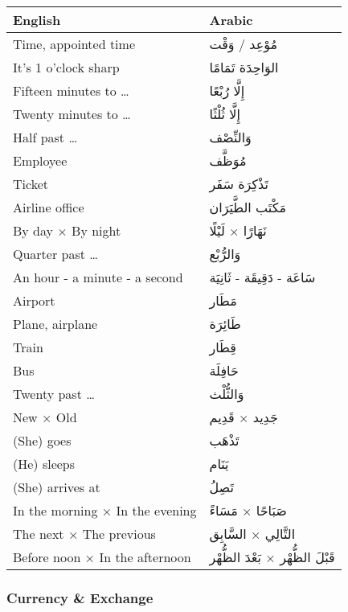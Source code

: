 \documentclass[
  a4paper,
  DIV=11,
  numbers=noendperiod]{scrartcl}
\begin{document}
\begin{longtable}[]{@{}ll@{}}
\toprule\noalign{}
English & Arabic \\
\midrule\noalign{}
\endhead
\bottomrule\noalign{}
\endlastfoot
Time, appointed time & مُوْعِد / وَقْت \\
It's 1 o'clock sharp & الوَاحِدَة تَمَامًا \\
Fifteen minutes to \ldots{} & إِلَّا رُبْعًا \\
Twenty minutes to \ldots{} & إِلَّا ثُلْثًا \\
Half past \ldots{} & وَالنِّصْف \\
Employee & مُوَظَّف \\
Ticket & تَذْكِرَة سَفَر \\
Airline office & مَكْتَب الطَّيَرَان \\
By day × By night & نَهَارًا × لَيْلًا \\
Quarter past \ldots{} & وَالرُّبْع \\
An hour - a minute - a second & سَاعَة - دَقِيقَة - ثَانِيَة \\
Airport & مَطَار \\
Plane, airplane & طَائِرَة \\
Train & قِطَار \\
Bus & حَافِلَة \\
Twenty past \ldots{} & وَالثُّلْث \\
New × Old & جَدِيد × قَدِيم \\
(She) goes & تَذْهَب \\
(He) sleeps & يَنَام \\
(She) arrives at & تَصِلُ \\
In the morning × In the evening & صَبَاحًا × مَسَاءً \\
The next × The previous & التَّالِي × السَّابِق \\
Before noon × In the afternoon & قَبْلَ الظُّهْر × بَعْدَ الظُّهْر \\
\end{longtable}

\subsubsection{Currency \& Exchange}\label{currency-exchange}
\end{document}
